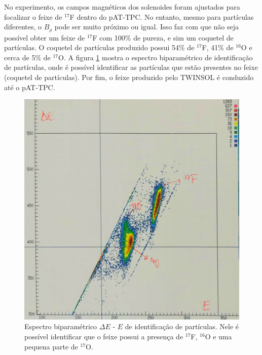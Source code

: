\documentclass[a4paper,12pt,oneside]{book}
\begin{document}

\par No experimento, os campos magnéticos dos solenoides foram ajustados para focalizar o feixe de $^{17}$F dentro do pAT-TPC. No entanto, mesmo para partículas diferentes, o $B_{\rho}$ pode ser muito próximo ou igual. Isso faz com que não seja possível obter um feixe de $^{17}$F com 100\% de pureza, e sim um coquetel de partículas\cite{zamora_mater}. O coquetel de partículas produzido possui 54\% de $^{17}$F, 41\% de $^{16}$O e cerca de 5\% de $^{17}$O. A figura \ref{fig:PID_17F} mostra o espectro biparamétrico de identificação de partículas, onde é possível identificar as partículas que estão presentes no feixe (coquetel de partículas). Por fim, o feixe  produzido pelo TWINSOL é conduzido até o pAT-TPC.

\begin{figure}[H]
    \centering
    \includegraphics[scale = 0.12]{figs/pid_17F.png}
    \caption{Espectro biparamétrico $\Delta E$ - $E$ de identificação de partículas. Nele é possível identificar que o feixe possui a presença de $^{17}$F, $^{16}$O e uma pequena parte de $^{17}$O.}
    \label{fig:PID_17F}
\end{figure}
\end{document}
